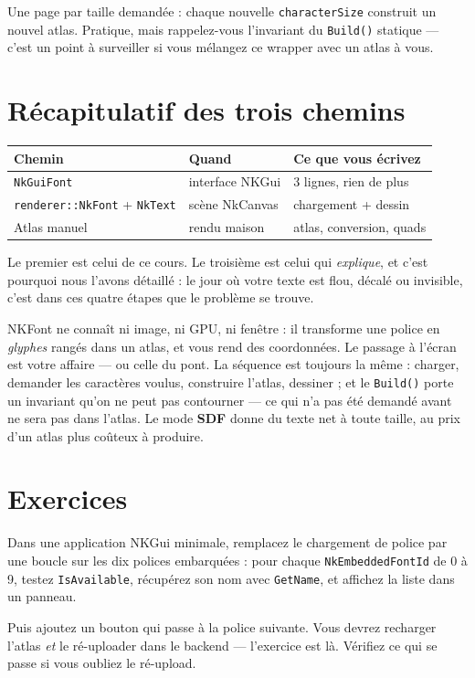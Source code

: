 Une page par taille demandée : chaque nouvelle \texttt{characterSize} construit
un nouvel atlas. Pratique, mais rappelez-vous l'invariant du \texttt{Build()}
statique — c'est un point à surveiller si vous mélangez ce wrapper avec un atlas
à vous.

\section{Récapitulatif des trois chemins}

\begin{center}
\begin{tabular}{@{}lll@{}}
\toprule
\textbf{Chemin} & \textbf{Quand} & \textbf{Ce que vous écrivez} \\
\midrule
\texttt{NkGuiFont} & interface NKGui & 3 lignes, rien de plus \\
\texttt{renderer::NkFont} + \texttt{NkText} & scène NkCanvas & chargement + dessin \\
Atlas manuel & rendu maison & atlas, conversion, quads \\
\bottomrule
\end{tabular}
\end{center}

Le premier est celui de ce cours. Le troisième est celui qui \emph{explique}, et
c'est pourquoi nous l'avons détaillé : le jour où votre texte est flou, décalé
ou invisible, c'est dans ces quatre étapes que le problème se trouve.

\begin{nkbilan}
NKFont ne connaît ni image, ni GPU, ni fenêtre : il transforme une police en
\emph{glyphes} rangés dans un atlas, et vous rend des coordonnées. Le passage à
l'écran est votre affaire --- ou celle du pont. La séquence est toujours la
même : charger, demander les caractères voulus, construire l'atlas, dessiner ; et
le \texttt{Build()} porte un invariant qu'on ne peut pas contourner --- ce qui
n'a pas été demandé avant ne sera pas dans l'atlas. Le mode \textbf{SDF} donne du
texte net à toute taille, au prix d'un atlas plus coûteux à produire.
\end{nkbilan}

\section{Exercices}

\begin{nkpratique}
Dans une application NKGui minimale, remplacez le chargement de police par une
boucle sur les dix polices embarquées : pour chaque
\texttt{NkEmbeddedFontId} de 0 à 9, testez \texttt{IsAvailable}, récupérez son
nom avec \texttt{GetName}, et affichez la liste dans un panneau.

Puis ajoutez un bouton qui passe à la police suivante. Vous devrez recharger
l'atlas \emph{et} le ré-uploader dans le backend — l'exercice est là. Vérifiez ce
qui se passe si vous oubliez le ré-upload.
\end{nkpratique}

